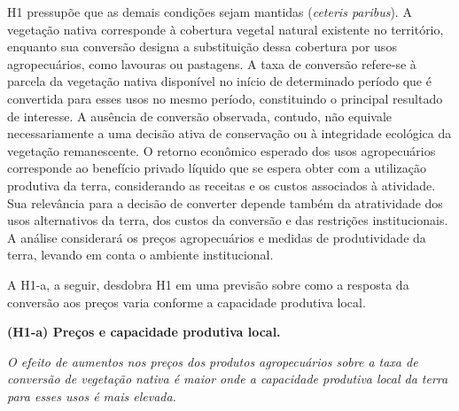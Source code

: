 

H1 pressupõe que as demais condições sejam mantidas (\textit{ceteris paribus}). A vegetação nativa corresponde à cobertura vegetal natural existente no território, enquanto sua conversão designa a substituição dessa cobertura por usos agropecuários, como lavouras ou pastagens. A taxa de conversão refere-se à parcela da vegetação nativa disponível no início de determinado período que é convertida para esses usos no mesmo período, constituindo o principal resultado de interesse. A ausência de conversão observada, contudo, não equivale necessariamente a uma decisão ativa de conservação ou à integridade ecológica da vegetação remanescente. O retorno econômico esperado dos usos agropecuários corresponde ao benefício privado líquido que se espera obter com a utilização produtiva da terra, considerando as receitas e os custos associados à atividade. Sua relevância para a decisão de converter depende também da atratividade dos usos alternativos da terra, dos custos da conversão e das restrições institucionais. A análise considerará os preços agropecuários e medidas de produtividade da terra, levando em conta o ambiente institucional. 

A H1-a, a seguir, desdobra H1 em uma previsão sobre como a resposta da conversão aos preços varia conforme a capacidade produtiva local.

\medskip

\noindent\textbf{(H1-a) Preços e capacidade produtiva local.}

\noindent\emph{O efeito de aumentos nos preços dos produtos agropecuários sobre a taxa de conversão de vegetação nativa é maior onde a capacidade produtiva local da terra para esses usos é mais elevada.}

